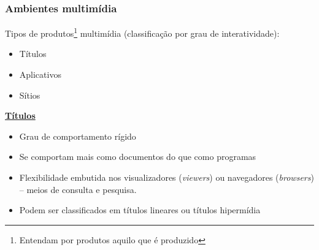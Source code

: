 \documentclass[xcolor]{beamer}
\begin{document}
\begin{frame}
    \frametitle{Ambientes multimídia}

    Tipos de produtos\footnote{Entendam por produtos aquilo que é produzido}
multimídia (classificação por grau de interatividade):

    \begin{itemize}
        \item Títulos
        \item Aplicativos
        \item Sítios
    \end{itemize}

    \uline{\bf Títulos}

    \begin{itemize}
        \item Grau de comportamento rígido
        \item Se comportam mais como documentos do que como programas
        \item Flexibilidade embutida nos visualizadores ({\it viewers}) ou
navegadores ({\it browsers}) -- meios de consulta e pesquisa.
        \item Podem ser classificados em títulos lineares ou títulos hipermídia
    \end{itemize}

\end{frame}
\end{document}
